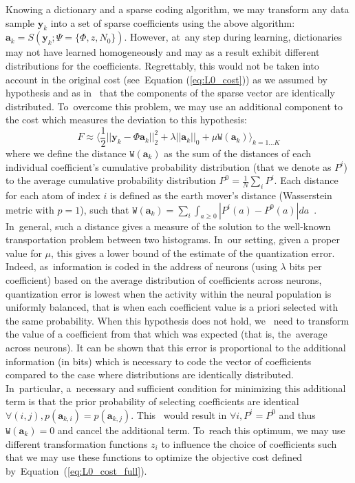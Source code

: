 \documentclass[vision,article,accept,oneauthor,pdftex]{Definitions/mdpi}
\newcommand{\coef}{\mathbf{a}} %
\newcommand{\image}{\mathbf{y}} %
\newcommand{\dico}{\Phi} %
\newcommand{\norm}[1]{|\!| #1 |\!|}
\begin{document}
Knowing a dictionary and a sparse coding algorithm, we may transform any data sample $\image_k$ into a set of sparse coefficients using the above algorithm: $\coef_{k} = S(\image_k; \Psi=\{\dico, z, N_0\})$. However, at~any step during learning, dictionaries may not have learned homogeneously and may as a result exhibit different distributions for the coefficients.
Regrettably, this would not be taken into account in the original cost (see~Equation	(\ref{eq:L0_cost})) as we assumed by hypothesis and as in~\cite{Olshausen97} that the components of the sparse vector are identically distributed. To~overcome this problem, we may use an additional component to the cost which measures the deviation to this hypothesis:
\begin{equation}%
F \approx \langle \frac{1}{2} \norm{\image_k - \dico \coef_{k}}_2^2 + \lambda\norm{\coef_{k}}_0 + \mu\texttt{W}(\coef_{k}) \rangle_{k = 1 \ldots K}%
\label{eq:L0_cost_full}%
\end{equation}%
where we define the distance $\texttt{W}(\coef_{k})$ as the sum of the distances of each individual coefficient's cumulative probability distribution (that we denote as $P^i$) to the average cumulative probability distribution $P^0 = \frac 1 N \sum_i P^i$. Each distance for each atom of index $i$ is defined as the earth mover's distance (Wasserstein metric with $p=1$), such {that} $ \texttt{W}(\coef_{k}) = \sum_i \int_{a\geq0} | P^i(a) - P^0(a)| da $~\citep{Vallender74}. In~general, such a distance gives a measure of the solution to the well-known transportation problem between two histograms. In~our setting, given a proper value for $\mu$, this gives a lower bound of the estimate of the quantization error. Indeed, as~information is coded in the address of neurons (using $\lambda$ bits per coefficient) based on the average distribution of coefficients across neurons, quantization error is lowest when the activity within the neural population is uniformly balanced, that is when each coefficient value is a priori selected with the same probability. When this hypothesis does not hold, we~ need to transform the value of a coefficient from that which was expected (that is, the~average across neurons). It can be shown that this error is proportional to the additional information (in bits) which is necessary to code the vector of coefficients compared to the case where distributions are identically distributed. In~particular, a~necessary and sufficient condition for minimizing this additional term is that the prior probability of selecting coefficients are identical $\forall (i,j), p(\coef_{k,i})=p(\coef_{k,j})$. This~ would result in $\forall i, P^i = P^0$ and thus $\texttt{W}(\coef_{k})= 0$ and cancel the additional term. To~reach this optimum, we may use different transformation functions $z_i$ to influence the choice of coefficients such that we may use these functions to optimize the objective cost defined by~Equation~(\ref{eq:L0_cost_full}).
\end{document}
